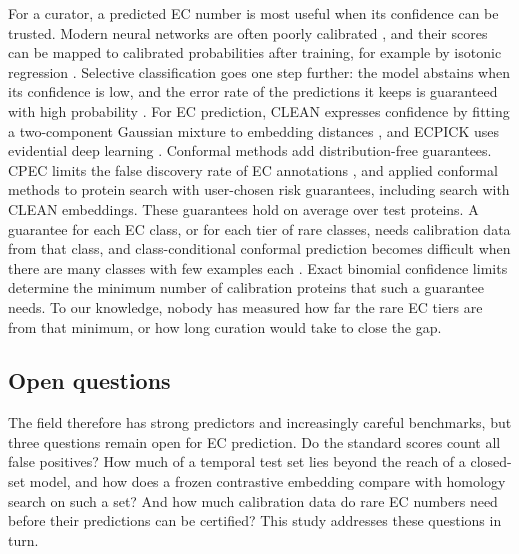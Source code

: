 For a curator, a predicted EC number is most useful when its confidence can be trusted. Modern neural networks are often poorly calibrated \citep{Guo2017}, and their scores can be mapped to calibrated probabilities after training, for example by isotonic regression \citep{Zadrozny2002}. Selective classification goes one step further: the model abstains when its confidence is low, and the error rate of the predictions it keeps is guaranteed with high probability \citep{Geifman2017}. For EC prediction, CLEAN expresses confidence by fitting a two-component Gaussian mixture to embedding distances \citep{Yu2023}, and ECPICK uses evidential deep learning \citep{Han2024}. Conformal methods add distribution-free guarantees. CPEC limits the false discovery rate of EC annotations \citep{DingK2024}, and \citet{Boger2025} applied conformal methods to protein search with user-chosen risk guarantees, including search with CLEAN embeddings. These guarantees hold on average over test proteins. A guarantee for each EC class, or for each tier of rare classes, needs calibration data from that class, and class-conditional conformal prediction becomes difficult when there are many classes with few examples each \citep{DingT2023}. Exact binomial confidence limits \citep{Clopper1934} determine the minimum number of calibration proteins that such a guarantee needs. To our knowledge, nobody has measured how far the rare EC tiers are from that minimum, or how long curation would take to close the gap.

\subsection{Open questions}\label{sec:related:open}

The field therefore has strong predictors and increasingly careful benchmarks, but three questions remain open for EC prediction. Do the standard scores count all false positives? How much of a temporal test set lies beyond the reach of a closed-set model, and how does a frozen contrastive embedding compare with homology search on such a set? And how much calibration data do rare EC numbers need before their predictions can be certified? This study addresses these questions in turn.

